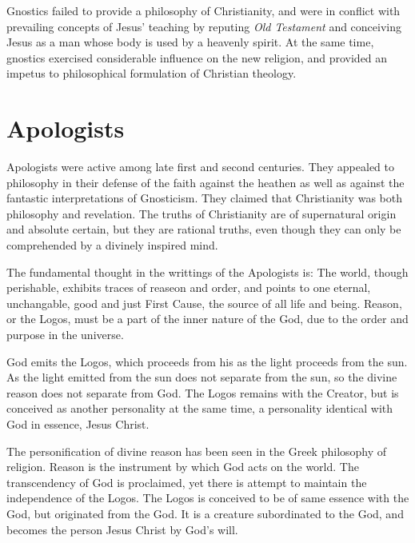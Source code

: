 \documentclass[11pt]{article}
\begin{document}
\par

Gnostics failed to provide a philosophy of Christianity, and were in conflict with prevailing concepts of Jesus' teaching by reputing \textit{Old Testament} and conceiving Jesus as a man whose body is used by a heavenly spirit. 
At the same time, gnostics exercised considerable influence on the new religion, and provided an impetus to philosophical formulation of Christian theology.

\section{Apologists}
Apologists were active among late first and second centuries. 
They appealed to philosophy in their defense of the faith against the heathen as well as against the fantastic interpretations of Gnosticism. 
They claimed that Christianity was both philosophy and revelation. 
The truths of Christianity are of supernatural origin and absolute certain, but they are rational truths, even though they can only be comprehended by a divinely inspired mind. 

\par

The fundamental thought in the writtings of the Apologists is: 
The world, though perishable, exhibits traces of reaseon and order, and points to one eternal, unchangable, good and just First Cause, the source of all life and being. 
Reason, or the Logos, must be a part of the inner nature of the God, due to the order and purpose in the universe. 

\par

God emits the Logos, which proceeds from his as the light proceeds from the sun. 
As the light emitted from the sun does not separate from the sun, so the divine reason does not separate from God. 
The Logos remains with the Creator, but is conceived as another personality at the same time, a personality identical with God in essence, Jesus Christ. 

\par

The personification of divine reason has been seen in the Greek philosophy of religion. 
Reason is the instrument by which God acts on the world. 
The transcendency of God is proclaimed, yet there is attempt to maintain the independence of the Logos. 
The Logos is conceived to be of same essence with the God, but originated from the God. 
It is a creature subordinated to the God, and becomes the person Jesus Christ by God's will. 
\end{document}
